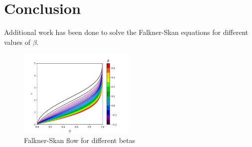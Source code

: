 \documentclass[conf]{new-aiaa}
\begin{document}
\begin{center}
    \resizebox{0.35\linewidth}{!}{}
\end{center}

\section{Conclusion}

\appendix
Additional work has been done to solve the Falkner-Skan equations for different values of $\beta$. 
\begin{figure}[H]
    \centering
    \includegraphics[width=0.5\textwidth]{Continuous beta.png}
    \caption{Falkner-Skan flow for different betas}
    \label{fig:Falkner-Skan multiples betas}
\end{figure}
\end{document}
